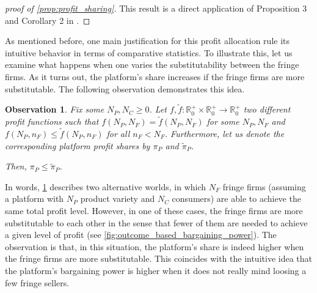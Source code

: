 \documentclass[a4paper]{article}
\newtheorem{observation}{Observation}
\begin{document}
\begin{proof}[proof of \cref{prop:profit_sharing}]
    This result is a direct application of Proposition 3 and Corollary 2 in \textcite{stancsics2023value}.
\end{proof}

As mentioned before, one main justification for this profit allocation rule its intuitive behavior in terms of comparative statistics.
To illustrate this, let us examine what happens when one varies the substitutability between the fringe firms.
As it turns out, the platform's share increases if the fringe firms are more substitutable.
The following observation demonstrates this idea.
\begin{observation}
    \label{prop:outcome_based_bargaining_power}
    Fix some $N_P, N_C \geq 0$. Let $f, \tilde{f}: \mathbb{R}^+_0 \times \mathbb{R}^+_0 \to \mathbb{R}^+_0$ two different profit functions such that $f(N_P, N_F) = \tilde{f}(N_P, N_F)$ for some $N_P, N_F$ and $f(N_P, n_F) \leq \tilde{f}(N_P, n_F)$ for all $n_F < N_F$.
    Furthermore, let us denote the corresponding platform profit shares by $\pi_P$ and $\tilde{\pi}_P$.
    
    Then, $\pi_P \leq \tilde{\pi}_P$.
\end{observation}

In words, \cref{prop:outcome_based_bargaining_power} describes two alternative worlds, in which $N_F$ fringe firms (assuming a platform with $N_P$ product variety and $N_C$ consumers) are able to achieve the same total profit level.
However, in one of these cases, the fringe firms are more substitutable to each other in the sense that fewer of them are needed to achieve a given level of profit (see \cref{fig:outcome_based_bargaining_power}).
The observation is that, in this situation, the platform's share is indeed higher when the fringe firms are more substitutable.
This coincides with the intuitive idea that the platform's bargaining power is higher when it does not really mind loosing a few fringe sellers.
\end{document}
